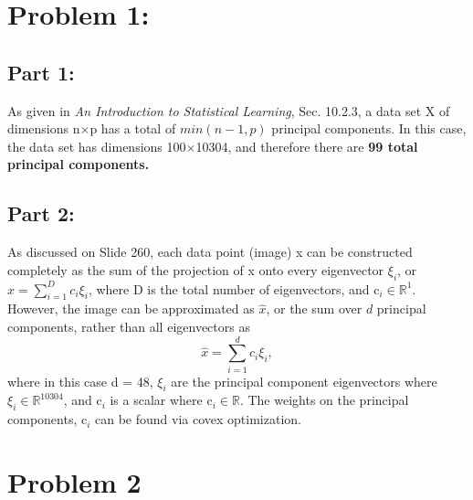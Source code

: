 \documentclass[12pt]{article}%
\begin{document}
\section{Problem 1:}

\subsection{Part 1:}
As given in \textit{An Introduction to Statistical Learning}, Sec. 10.2.3, a data set \textsc{X} of dimensions n$\times$p has a total of $min(n-1,p)$ principal components. In this case, the data set has dimensions 100$\times$10304, and therefore there are \textbf{99 total principal components.}

\subsection{Part 2:}
As discussed on Slide 260, each data point (image) x can be constructed completely as the sum of the projection of x onto every eigenvector $\xi_{i}$, or $x = \sum^{D}_{i=1} c_{i}\xi_{i}$, where D is the total number of eigenvectors, and c$_{i} \in \mathbb{R}^{1}$. However, the image can be approximated as $\hat{x}$, or the sum over $d$ principal components, rather than all eigenvectors as
\begin{equation}
\hat{x} = \sum^{d}_{i=1} c_{i}\xi_{i},
\end{equation}
where in this case d = 48, $\xi_{i}$ are the principal component eigenvectors where $\xi_i \in \mathbb{R}^{10304}$, and c$_{i}$ is a scalar where c$_{i} \in \mathbb{R}$. The weights on the principal components, c$_{i}$ can be found via covex optimization.

\section{Problem 2}
\end{document}
